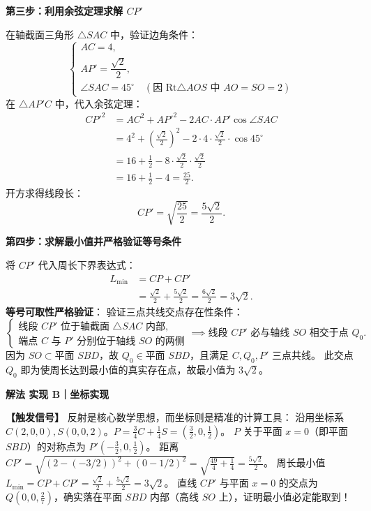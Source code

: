 \documentclass[11pt,a4paper,fontset=fandol]{ctexart}
\newcommand{\ans}[1]{\boxed{#1}}
\newcommand{\method}[1]{\par\medskip\noindent\textbf{解法 #1}\par}
\begin{document}
\textbf{第三步：利用余弦定理求解 $CP'$}

在轴截面三角形 $\triangle SAC$ 中，验证边角条件：
\[
\begin{cases}
AC = 4,\\[0.3em]
AP' = \dfrac{\sqrt{2}}{2},\\[0.4em]
\angle SAC = 45^\circ \quad (\text{因 Rt}\triangle AOS \text{ 中 } AO = SO = 2)
\end{cases}
\]
在 $\triangle AP'C$ 中，代入余弦定理：
\begin{align*}
CP'^2 &= AC^2 + AP'^2 - 2AC \cdot AP' \cos \angle SAC\\[0.4em]
&= 4^2 + \left(\frac{\sqrt{2}}{2}\right)^2 - 2 \cdot 4 \cdot \frac{\sqrt{2}}{2} \cdot \cos 45^\circ\\[0.4em]
&= 16 + \frac{1}{2} - 8 \cdot \frac{\sqrt{2}}{2} \cdot \frac{\sqrt{2}}{2}\\[0.4em]
&= 16 + \frac{1}{2} - 4 = \frac{25}{2}.
\end{align*}
开方求得线段长：
\[
CP' = \sqrt{\frac{25}{2}} = \frac{5\sqrt{2}}{2}.
\]

\textbf{第四步：求解最小值并严格验证等号条件}

将 $CP'$ 代入周长下界表达式：
\begin{align*}
L_{\min} &= CP + CP'\\[0.4em]
&= \frac{\sqrt{2}}{2} + \frac{5\sqrt{2}}{2} = \frac{6\sqrt{2}}{2} = \ans{3\sqrt{2}}.
\end{align*}
\textbf{等号可取性严格验证}：
验证三点共线交点存在性条件：
\[
\begin{cases}
\text{线段 } CP' \text{ 位于轴截面 } \triangle SAC \text{ 内部},\\[0.3em]
\text{端点 } C \text{ 与 } P' \text{ 分别位于轴线 } SO \text{ 的两侧}
\end{cases}
\implies \text{线段 } CP' \text{ 必与轴线 } SO \text{ 相交于点 } Q_0.
\]
因为 $SO \subset \text{平面 } SBD$，故 $Q_0 \in \text{平面 } SBD$，且满足 $C, Q_0, P'$ 三点共线。
此交点 $Q_0$ 即为使周长达到最小值的真实存在点，故最小值为 \(\ans{3\sqrt{2}}\)。

\method{实现 B｜坐标实现}

\noindent\textbf{【触发信号】}
反射是核心数学思想，而坐标则是精准的计算工具：
沿用坐标系 $C(2,0,0), S(0,0,2)$。$P = \frac{3}{4}C + \frac{1}{4}S = \left(\frac{3}{2}, 0, \frac{1}{2}\right)$。
$P$ 关于平面 $x=0$（即平面 $SBD$）的对称点为 $P'\left(-\frac{3}{2}, 0, \frac{1}{2}\right)$。
距离 $CP' = \sqrt{(2 - (-3/2))^2 + (0 - 1/2)^2} = \sqrt{\frac{49}{4} + \frac{1}{4}} = \frac{5\sqrt{2}}{2}$。
周长最小值 $L_{\min} = CP + CP' = \frac{\sqrt{2}}{2} + \frac{5\sqrt{2}}{2} = 3\sqrt{2}$。
直线 $CP'$ 与平面 $x=0$ 的交点为 $Q\left(0, 0, \frac{2}{7}\right)$，确实落在平面 $SBD$ 内部（高线 $SO$ 上），证明最小值必定能取到！
\end{document}
